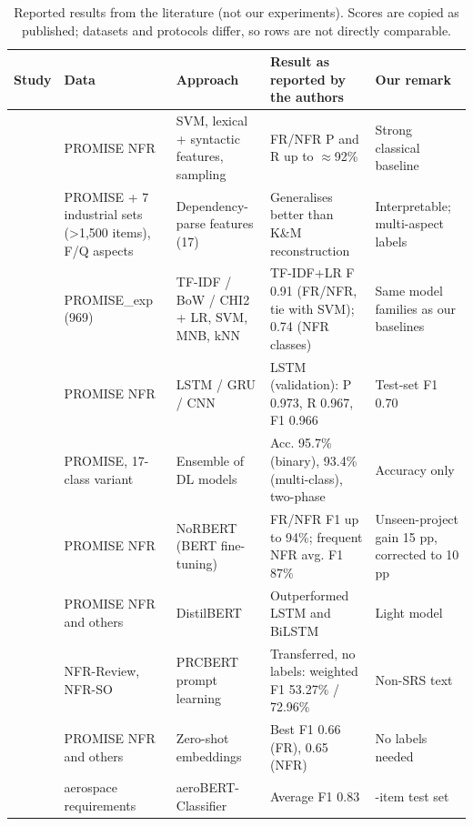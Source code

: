 \documentclass[conference,10pt,letterpaper]{IEEEtran}
\begin{document}
\begin{table}[!t]
\centering
\caption{Reported results from the literature (not our experiments). Scores are copied as published; datasets and protocols differ, so rows are not directly comparable.}
\label{tab:lit}
\footnotesize
\setlength{\tabcolsep}{3pt}
\renewcommand{\arraystretch}{1.12}
\begin{tabular}{>{\raggedright\arraybackslash}p{2.3cm}>{\raggedright\arraybackslash}p{3.0cm}>{\raggedright\arraybackslash}p{3.1cm}>{\raggedright\arraybackslash}p{4.3cm}>{\raggedright\arraybackslash}p{3.6cm}}
\toprule
\textbf{Study} & \textbf{Data} & \textbf{Approach} & \textbf{Result as reported by the authors} & \textbf{Our remark} \\
\midrule
\cite{kurtanovic2017} & PROMISE NFR & SVM, lexical + syntactic features, sampling & FR/NFR P and R up to $\approx$92\% & Strong classical baseline \\
\cite{dalpiaz2019} & PROMISE + 7 industrial sets (\textgreater{}1,500 items), F/Q aspects & Dependency-parse features (17) & Generalises better than K\&M reconstruction & Interpretable; multi-aspect labels \\
\cite{diascanedo2020} & PROMISE\_exp (969) & TF-IDF / BoW / CHI2 + LR, SVM, MNB, kNN & TF-IDF+LR F 0.91 (FR/NFR, tie with SVM); 0.74 (NFR classes) & Same model families as our baselines \\
\cite{rahman2019} & PROMISE NFR & LSTM / GRU / CNN & LSTM (validation): P 0.973, R 0.967, F1 0.966 & Test-set F1 0.70 \\
\cite{rahimi2021} & PROMISE, 17-class variant & Ensemble of DL models & Acc. 95.7\% (binary), 93.4\% (multi-class), two-phase & Accuracy only \\
\cite{hey2020norbert} & PROMISE NFR & NoRBERT (BERT fine-tuning) & FR/NFR F1 up to 94\%; frequent NFR avg. F1 87\% & Unseen-project gain 15 pp, corrected to 10 pp~\cite{hey2022corrected} \\
\cite{kici2021} & PROMISE NFR and others & DistilBERT & Outperformed LSTM and BiLSTM & Light model \\
\cite{luo2022prcbert} & NFR-Review, NFR-SO & PRCBERT prompt learning & Transferred, no labels: weighted F1 53.27\% / 72.96\% & Non-SRS text \\
\cite{alhoshan2023} & PROMISE NFR and others & Zero-shot embeddings & Best F1 0.66 (FR), 0.65 (NFR) & No labels needed \\
\cite{tikayatray2023} & 310 aerospace requirements & aeroBERT-Classifier & Average F1 0.83 & 31-item test set \\

\end{tabular}
\end{table}
\end{document}
